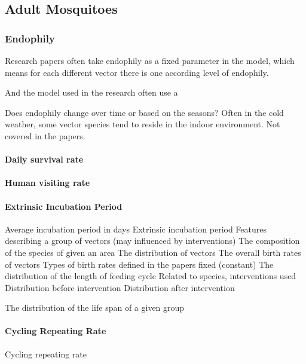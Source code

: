 \documentclass[a4paper, 12pt, twoside]{article}
\begin{document}
\subsection{Adult Mosquitoes}

\subsubsection{Endophily}
Research papers often take endophily as a fixed parameter in the model, which means for each different vector there is one according level of endophily.

And the model used in the research often use a 

Does endophily change over time or based on the seasons? Often in the cold weather, some vector species tend to reside in the indoor environment. Not covered in the papers.


\paragraph{Daily survival rate}

\paragraph{Human visiting rate}

\paragraph{Extrinsic Incubation Period}
Average incubation period in days
Extrinsic incubation period
Features describing a group of vectors (may influenced by interventions)
The composition of the species of given an area
The distribution of vectors
The overall birth rates of vectors
	Types of birth rates defined in the papers
fixed (constant)
The distribution of the length of feeding cycle
Related to species, interventions used
Distribution before intervention
Distribution after intervention

The distribution of the life span of a given group

\paragraph{Cycling Repeating Rate}
Cycling repeating rate
\end{document}
